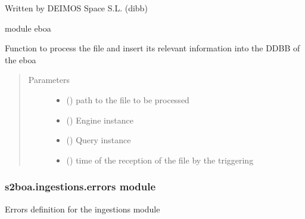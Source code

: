 Written by DEIMOS Space S.L. (dibb)

module eboa

\begin{fulllineitems}
\label{\detokenize{s2boa.ingestions:s2boa.ingestions.ingestion_station_schedule.ingestion_station_schedule.process_file}}
Function to process the file and insert its relevant information
into the DDBB of the eboa
\begin{quote}\begin{description}
\item[{Parameters}] \leavevmode\begin{itemize}
\item {} 
 () \textendash{} path to the file to be processed

\item {} 
 () \textendash{} Engine instance

\item {} 
 () \textendash{} Query instance

\item {} 
 () \textendash{} time of the reception of the file by the triggering

\end{itemize}

\end{description}\end{quote}

\end{fulllineitems}



\subsubsection{s2boa.ingestions.errors module}
\label{\detokenize{s2boa.ingestions:module-s2boa.ingestions.errors}}\label{\detokenize{s2boa.ingestions:s2boa-ingestions-errors-module}}
Errors definition for the ingestions module

